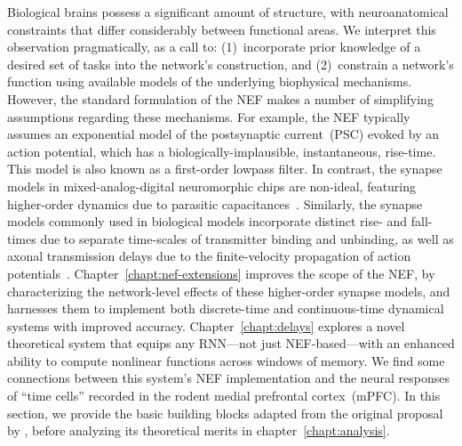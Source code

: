 Biological brains possess a significant amount of structure, with neuroanatomical constraints that differ considerably between functional areas. %
We interpret this observation pragmatically, as a call to: (1)~incorporate prior knowledge of a desired set of tasks into the network's construction, and (2)~constrain a network's function using available models of the underlying biophysical mechanisms.
However, the standard formulation of the NEF makes a number of simplifying assumptions regarding these mechanisms.
For example, the NEF typically assumes an exponential model of the postsynaptic current~(PSC) evoked by an action potential, which has a biologically-implausible, instantaneous, rise-time.
This model is also known as a first-order lowpass filter.
In contrast, the synapse models in mixed-analog-digital neuromorphic chips are non-ideal, featuring higher-order dynamics due to parasitic capacitances~\citep{voelker2017iscas}.
Similarly, the synapse models commonly used in biological models incorporate distinct rise- and fall-times due to separate time-scales of transmitter binding and unbinding, as well as axonal transmission delays due to the finite-velocity propagation of action potentials~\citep{roth2009modeling}.
Chapter~\ref{chapt:nef-extensions} improves the scope of the NEF, by characterizing the network-level effects of these higher-order synapse models, and harnesses them to implement both discrete-time and continuous-time dynamical systems with improved accuracy.
Chapter~\ref{chapt:delays} explores a novel theoretical system that equips any RNN---not just NEF-based---with an enhanced ability to compute nonlinear functions across windows of memory.
We find some connections between this system's NEF implementation and the neural responses of ``time cells'' recorded in the rodent medial prefrontal cortex~(mPFC).
In this section, we provide the basic building blocks adapted from the original proposal by \citet{eliasmith2003a}, before analyzing its theoretical merits in chapter~\ref{chapt:analysis}.

